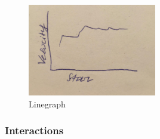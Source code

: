 \documentclass{article}
\begin{document}
\begin{figure}[!h]
\centering
\includegraphics[width=0.5\textwidth]{images/Velocity(star).jpg}
	\caption{Linegraph }
	\label{fig13}
\end{figure}

\newpage

\subsubsection{Interactions}
\end{document}
